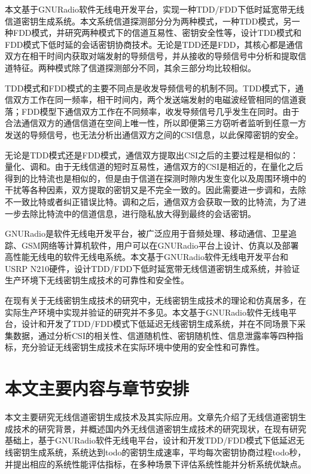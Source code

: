 \documentclass[master]{seuthesis} %
\begin{document}
\begin{Main}
本文基于GNURadio软件无线电开发平台，实现一种TDD/FDD下低时延宽带无线信道密钥生成系统。本文系统信道探测部分分为两种模式，一种TDD模式，另一种FDD模式，并研究两种模式下的信道互易性、密钥安全性等，设计TDD模式和FDD模式下低时延的会话密钥协商技术。无论是TDD还是FDD，其核心都是通信双方在相干时间内获取对端发射的导频信号，并从接收的导频信号中分析和提取信道特征。两种模式除了信道探测部分不同，其余三部分均比较相似。

TDD模式和FDD模式的主要不同点是收发导频信号的机制不同。TDD模式下，通信双方工作在同一频率，相干时间内，两个发送端发射的电磁波经管相同的信道衰落；FDD模型下通信双方工作在不同频率，收发导频信号几乎发生在同时。由于合法通信双方的通信信道在空间上唯一性，所以即便第三方窃听者监听到任意一方发送的导频信号，也无法分析出通信双方之间的CSI信息，以此保障密钥的安全。

无论是TDD模式还是FDD模式，通信双方提取出CSI之后的主要过程是相似的：量化、调和。由于无线信道的短时互易性，通信双方的CSI是相近的，在量化之后得到的比特流也是相似的，但是由于信道在探测时隙内发生变化以及周围环境中的干扰等各种因素，双方提取的密钥又是不完全一致的。因此需要进一步调和，去除不一致比特或者纠正错误比特。调和之后，通信双方会获取一致的比特流，为了进一步去除比特流中的信道信息，进行隐私放大得到最终的会话密钥。

GNURadio是软件无线电开发平台，被广泛应用于音频处理、移动通信、卫星追踪、GSM网络等计算机软件\cite{Blossom2004GNU}，用户可以在GNURadio平台上设计、仿真以及部署高性能无线电的软件无线电系统。本文基于GNURadio软件无线电开发平台和USRP N210硬件，设计TDD/FDD下低时延宽带无线信道密钥生成系统，并验证生产环境下无线密钥生成技术的可靠性和安全性。

在现有关于无线密钥生成技术的研究中，无线密钥生成技术的理论和仿真居多，在实际生产环境中实现并验证的研究并不多见。本文基于GNURadio软件无线电平台，设计和开发了TDD/FDD模式下低延迟无线密钥生成系统，并在不同场景下采集数据，通过分析CSI的相关性、信道随机性、密钥随机性、信息泄露率等四种指标，充分验证无线密钥生成技术在实际环境中使用的安全性和可靠性。

\section{本文主要内容与章节安排}

本文主要研究无线信道密钥生成技术及其实际应用。文章先介绍了无线信道密钥生成技术的研究背景，并概述国内外无线信道密钥生成技术的研究现状，在现有研究基础上，基于GNURadio软件无线电平台，设计和开发TDD/FDD模式下低延迟无线密钥生成系统，系统达到todo的密钥生成速率，平均每次密钥协商过程todo秒，并提出相应的系统性能评估指标，在多种场景下评估系统性能并分析系统优缺点。


\end{Main}
\end{document}
